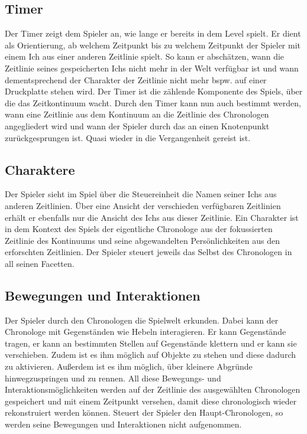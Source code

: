 \subsection{Timer}
Der Timer zeigt dem Spieler an, wie lange er bereits in dem Level spielt. Er dient als Orientierung, ab welchem Zeitpunkt bis zu welchem Zeitpunkt der Spieler mit einem Ich aus einer anderen Zeitlinie spielt. So kann er abschätzen, wann die Zeitlinie seines gespeicherten Ichs nicht mehr in der Welt verfügbar ist und wann dementsprechend der Charakter der Zeitlinie nicht mehr bspw. auf einer Druckplatte stehen wird. Der Timer ist die zählende Komponente des Spiels, über die das Zeitkontinuum wacht. Durch den Timer kann nun auch bestimmt werden, wann eine Zeitlinie aus dem Kontinuum an die Zeitlinie des Chronologen angegliedert wird und wann der Spieler durch das  an einen Knotenpunkt zurückgesprungen ist. Quasi wieder in die Vergangenheit gereist ist.

\subsection{Charaktere}
Der Spieler sieht im  Spiel über die Steuereinheit die Namen seiner Ichs aus anderen Zeitlinien. Über eine Ansicht der verschieden verfügbaren Zeitlinien erhält er ebenfalls nur die Ansicht des Ichs aus dieser Zeitlinie. Ein Charakter ist in dem Kontext des Spiels der eigentliche Chronologe aus der fokussierten Zeitlinie des Kontinuums und seine abgewandelten Persönlichkeiten aus den erforschten Zeitlinien. Der Spieler steuert jeweils das Selbst des Chronologen in all seinen Facetten.

\subsection{Bewegungen und Interaktionen}
Der Spieler durch den Chronologen die Spielwelt erkunden. Dabei kann der Chronologe mit Gegenständen wie Hebeln interagieren. Er kann Gegenstände tragen, er kann an bestimmten Stellen auf Gegenstände klettern und er kann sie verschieben. Zudem ist es ihm möglich auf Objekte zu stehen und diese dadurch zu aktivieren. Außerdem ist es ihm möglich, über kleinere Abgründe hinwegzuspringen und zu rennen. All diese Bewegungs- und Interaktionsmöglichkeiten werden auf der Zeitlinie des ausgewählten Chronologen gespeichert und mit einem Zeitpunkt versehen, damit diese chronologisch wieder rekonstruiert werden können. Steuert der Spieler den Haupt-Chronologen, so werden seine Bewegungen und Interaktionen nicht aufgenommen.

